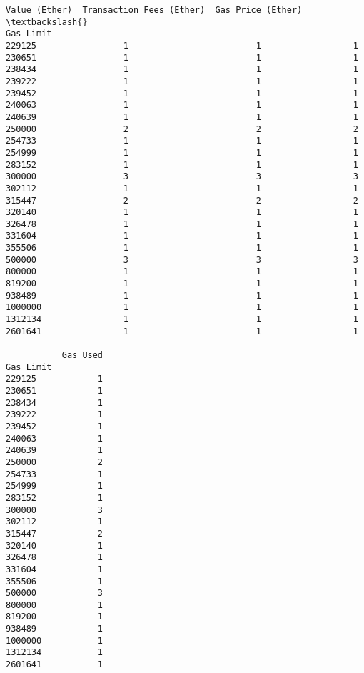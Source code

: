 \documentclass[11pt]{article}
\begin{document}
\begin{Verbatim}[commandchars=\\\{\}]
           Value (Ether)  Transaction Fees (Ether)  Gas Price (Ether)  \textbackslash{}
Gas Limit                                                               
229125                 1                         1                  1   
230651                 1                         1                  1   
238434                 1                         1                  1   
239222                 1                         1                  1   
239452                 1                         1                  1   
240063                 1                         1                  1   
240639                 1                         1                  1   
250000                 2                         2                  2   
254733                 1                         1                  1   
254999                 1                         1                  1   
283152                 1                         1                  1   
300000                 3                         3                  3   
302112                 1                         1                  1   
315447                 2                         2                  2   
320140                 1                         1                  1   
326478                 1                         1                  1   
331604                 1                         1                  1   
355506                 1                         1                  1   
500000                 3                         3                  3   
800000                 1                         1                  1   
819200                 1                         1                  1   
938489                 1                         1                  1   
1000000                1                         1                  1   
1312134                1                         1                  1   
2601641                1                         1                  1   

           Gas Used  
Gas Limit            
229125            1  
230651            1  
238434            1  
239222            1  
239452            1  
240063            1  
240639            1  
250000            2  
254733            1  
254999            1  
283152            1  
300000            3  
302112            1  
315447            2  
320140            1  
326478            1  
331604            1  
355506            1  
500000            3  
800000            1  
819200            1  
938489            1  
1000000           1  
1312134           1  
2601641           1  

    \end{Verbatim}
\end{document}

